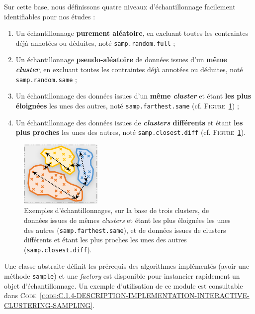 	Sur cette base, nous définissons quatre niveaux d'échantillonnage facilement identifiables pour nos études :
	\begin{enumerate}
		\item Un échantillonnage \textbf{purement aléatoire}, en excluant toutes les contraintes déjà annotées ou déduites, noté \texttt{samp.random.full} ;
		\item Un échantillonnage \textbf{pseudo-aléatoire} de données issues d'un \textbf{même \textit{cluster}}, en excluant toutes les contraintes déjà annotées ou déduites, noté \texttt{samp.random.same} ;
		\item Un échantillonnage des données issues d'un \textbf{même \textit{cluster}} et étant \textbf{les plus éloignées} les unes des autres, noté \texttt{samp.farthest.same} (cf. \textsc{Figure~\ref{figure:C.1.4-DESCRIPTION-IMPLEMENTATION-INTERACTIVE-CLUSTERING-CONTRAINTES-SAMPLING}}) ;
		\item Un échantillonnage des données issues de \textbf{\textit{clusters} différents} et étant \textbf{les plus proches} les unes des autres, noté \texttt{samp.closest.diff} (cf. \textsc{Figure~\ref{figure:C.1.4-DESCRIPTION-IMPLEMENTATION-INTERACTIVE-CLUSTERING-CONTRAINTES-SAMPLING}}).
	\end{enumerate}
	
	\begin{figure}[!htb]
		\centering
		\includegraphics[width=0.35\textwidth]{figures/example-sampling}
		\caption{
			Exemples d'échantillonnages, sur la base de trois clusters, de données issues de mêmes \textit{clusters} et étant les plus éloignées les unes des autres (\texttt{samp.farthest.same}), et de données issues de clusters différents et étant les plus proches les unes des autres (\texttt{samp.closest.diff}).
		}
		\label{figure:C.1.4-DESCRIPTION-IMPLEMENTATION-INTERACTIVE-CLUSTERING-CONTRAINTES-SAMPLING}
	\end{figure}

	Une classe abstraite définit les prérequis des algorithmes implémentés (avoir une méthode \texttt{sample}) et une \textit{factory} est disponible pour instancier rapidement un objet d'échantillonnage.
	Un exemple d'utilisation de ce module est consultable dans \textsc{Code~\ref{code:C.1.4-DESCRIPTION-IMPLEMENTATION-INTERACTIVE-CLUSTERING-SAMPLING}}.
	
